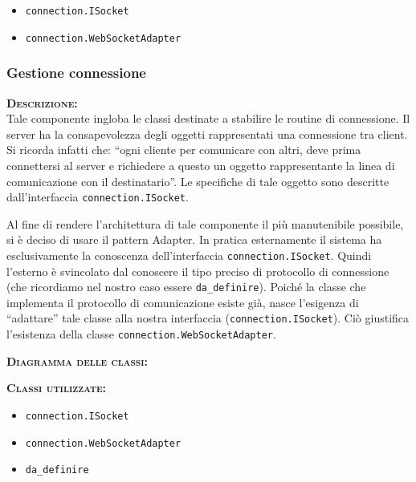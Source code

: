 \begin{itemize}
	\item \texttt{connection.ISocket}
	\item \texttt{connection.WebSocketAdapter}
\end{itemize}

\subsubsection{Gestione connessione}
\begin{description}
	\item{\scshape\bfseries Descrizione:}\\
Tale componente ingloba le classi destinate a stabilire le routine di connessione. Il server ha la consapevolezza degli oggetti rappresentati una connessione tra client. Si ricorda infatti che: ``ogni cliente per comunicare con altri, deve prima connettersi al server e richiedere a questo un oggetto rappresentante la linea di comunicazione con il destinatario''. Le specifiche di tale oggetto sono descritte dall'interfaccia \texttt{connection.ISocket}.

Al fine di rendere l'architettura di tale componente il più manutenibile possibile, si è deciso di usare il pattern Adapter. In pratica esternamente il sistema ha esclusivamente la conoscenza dell'interfaccia \texttt{connection.ISocket}. Quindi l'esterno è svincolato dal conoscere il tipo preciso di protocollo di connessione (che ricordiamo nel nostro caso essere \texttt{da\_definire}). Poiché la classe che implementa il protocollo di comunicazione esiste già, nasce l'esigenza di ``adattare'' tale classe alla nostra interfaccia (\texttt{connection.ISocket}). Ciò giustifica l'esistenza della classe \texttt{connection.WebSocketAdapter}.
	\item{\scshape\bfseries Diagramma delle classi:}
	\item{\scshape\bfseries Classi utilizzate:}
\begin{itemize}
  \item \texttt{connection.ISocket}
  \item \texttt{connection.WebSocketAdapter}
  \item \texttt{da\_definire}
\end{itemize}
\end{description}

